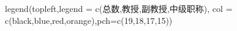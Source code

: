 \documentclass[]{tufte-book}
\newenvironment{Shaded}{}{}
\newcommand{\AttributeTok}[1]{\textcolor[rgb]{0.49,0.56,0.16}{#1}}
\newcommand{\DecValTok}[1]{\textcolor[rgb]{0.25,0.63,0.44}{#1}}
\newcommand{\FunctionTok}[1]{\textcolor[rgb]{0.02,0.16,0.49}{#1}}
\newcommand{\NormalTok}[1]{#1}
\newcommand{\StringTok}[1]{\textcolor[rgb]{0.25,0.44,0.63}{#1}}
\begin{document}
\begin{Shaded}
\begin{Highlighting}[]
\FunctionTok{legend}\NormalTok{(}\StringTok{\textquotesingle{}topleft\textquotesingle{}}\NormalTok{,}\AttributeTok{legend =} \FunctionTok{c}\NormalTok{(}\StringTok{\textquotesingle{}总数\textquotesingle{}}\NormalTok{,}\StringTok{\textquotesingle{}教授\textquotesingle{}}\NormalTok{,}\StringTok{\textquotesingle{}副教授\textquotesingle{}}\NormalTok{,}\StringTok{\textquotesingle{}中级职称\textquotesingle{}}\NormalTok{), }\AttributeTok{col =} \FunctionTok{c}\NormalTok{(}\StringTok{\textquotesingle{}black\textquotesingle{}}\NormalTok{,}\StringTok{\textquotesingle{}blue\textquotesingle{}}\NormalTok{,}\StringTok{\textquotesingle{}red\textquotesingle{}}\NormalTok{,}\StringTok{\textquotesingle{}orange\textquotesingle{}}\NormalTok{),}\AttributeTok{pch=}\FunctionTok{c}\NormalTok{(}\DecValTok{19}\NormalTok{,}\DecValTok{18}\NormalTok{,}\DecValTok{17}\NormalTok{,}\DecValTok{15}\NormalTok{))}


\end{Highlighting}
\end{Shaded}
\end{document}
